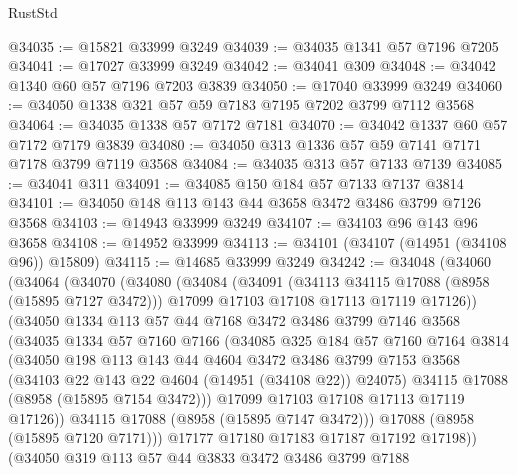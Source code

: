\begin{lexlean}{RustStd}
\begin{coremodule}
@34035 := @15821 @33999 @3249
@34039 := @34035 @1341 @57 @7196 @7205
@34041 := @17027 @33999 @3249
@34042 := @34041 @309
@34048 := @34042 @1340 @60 @57 @7196 @7203 @3839
@34050 := @17040 @33999 @3249
@34060 := @34050 @1338 @321 @57 @59 @7183 @7195 @7202 @3799 @7112 @3568
@34064 := @34035 @1338 @57 @7172 @7181
@34070 := @34042 @1337 @60 @57 @7172 @7179 @3839
@34080 := @34050 @313 @1336 @57 @59 @7141 @7171 @7178 @3799 @7119 @3568
@34084 := @34035 @313 @57 @7133 @7139
@34085 := @34041 @311
@34091 := @34085 @150 @184 @57 @7133 @7137 @3814
@34101 := @34050 @148 @113 @143 @44 @3658 @3472 @3486 @3799 @7126 @3568
@34103 := @14943 @33999 @3249
@34107 := @34103 @96 @143 @96 @3658
@34108 := @14952 @33999
@34113 := @34101 (@34107 (@14951 (@34108 @96)) @15809)
@34115 := @14685 @33999 @3249
@34242 := @34048
    (@34060
      (@34064
        (@34070
          (@34080
            (@34084
              (@34091
                (@34113 @34115 @17088 (@8958 (@15895 @7127 @3472)))
                @17099
                @17103
                @17108
                @17113
                @17119
                @17126))
            (@34050
              @1334
              @113
              @57
              @44
              @7168
              @3472
              @3486
              @3799
              @7146
              @3568
              (@34035
                @1334
                @57
                @7160
                @7166
                (@34085
                  @325
                  @184
                  @57
                  @7160
                  @7164
                  @3814
                  (@34050
                    @198
                    @113
                    @143
                    @44
                    @4604
                    @3472
                    @3486
                    @3799
                    @7153
                    @3568
                    (@34103 @22 @143 @22 @4604 (@14951 (@34108 @22)) @24075)
                    @34115
                    @17088
                    (@8958 (@15895 @7154 @3472)))
                  @17099
                  @17103
                  @17108
                  @17113
                  @17119
                  @17126))
              @34115
              @17088
              (@8958 (@15895 @7147 @3472)))
            @17088
            (@8958 (@15895 @7120 @7171)))
          @17177
          @17180
          @17183
          @17187
          @17192
          @17198))
      (@34050
        @319
        @113
        @57
        @44
        @3833
        @3472
        @3486
        @3799
        @7188

\end{coremodule}
\end{lexlean}

